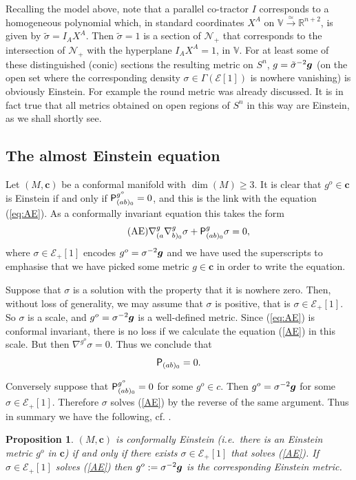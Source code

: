 \documentclass[a4paper,12pt]{amsart}
\def\Cal{\mathcal}
\newcommand{\V}{\mbox{\sf P}}
\newcommand{\cc}{\boldsymbol{c}}
\newcommand{\ce}{{\Cal E}}
\def\cN{\mathcal{N}}
\def\bg{\mbox{\boldmath $g$}}
\newcommand{\bV}{\mathbb{V}}
\newcommand{\lto}{\longrightarrow}
\newcommand{\si}{\sigma}
\newtheorem{proposition}[theorem]{Proposition}
\theoremstyle{remark}
\newcommand{\nn}[1]{(\ref{#1})}
\begin{document}
Recalling the model above, note that a parallel co-tractor $I$
corresponds to a homogeneous polynomial which, in standard coordinates
$X^A$ on $\mathbb{V}\stackrel{\simeq}{\lto}\mathbb{R}^{n+2}$, is given by
$\tilde{\si}=I_AX^A$. Then $\tilde{\si}=1$ is a section of $\cN_+$
that corresponds to the intersection of $\cN_+$ with the hyperplane
$I_AX^A=1$, in $\bV$. For at least some of these distinguished (conic)
sections the resulting metric on $S^n$, $g=\tilde{\si}^{-2}\bg$ (on
the open set where the corresponding density $\si\in \Gamma (\ce[1])$
is nowhere vanishing) is obviously Einstein. For example the round metric was already discussed. It is in fact true that all metrics obtained on open regions of $S^n$ in this way are Einstein, as we shall shortly see.

\subsection{The almost Einstein equation} \label{AEeq}


Let $(M,\cc)$ be a conformal manifold with $\dim (M)\geq  3$. It is clear that $g^o\in \cc$ is Einstein if and only if $\V^{g^o}_{(ab)_0}=0$, and this is the link with the equation \nn{eq:AE}.  As a conformally invariant
equation this takes the form
\begin{equation}\tag{AE}\label{AE}
\nabla^g_{(a}\nabla^g_{b)_0}\sigma+\V^g_{(ab)_0}\sigma=0,
\end{equation}
where $\si\in \ce_+[1]$ encodes $g^o=\si^{-2}\bg$ and we have used the superscripts to emphasise that
we have picked some metric $g\in \cc$ in order to write the equation.
 
Suppose that $\sigma$ is a solution with the property that it is
nowhere zero. Then, without loss of generality, we may assume that
$\si$ is positive, that is $\sigma\in \mathcal{E}_+[1]$. So $\si$ is
a scale, and $g^o=\sigma^{-2}\bg$ is a well-defined metric.  Since
\nn{eq:AE} is conformal invariant, there is no loss if we
calculate the equation \nn{AE} in this scale. But then
$\nabla^{g^o}\sigma=0$. Thus we conclude that
$$ \V_{(ab)_0}=0.$$

Conversely suppose that $\V^{g^o}_{(ab)_0}=0$ for some $g^o\in c$.
Then $g^o=\sigma^{-2}\bg$ for some $\sigma\in\mathcal{E}_+[1]$.
Therefore $\sigma$ solves \nn{AE} by the reverse of the same argument. 
Thus in summary we have the following, cf. \cite{LeBrunAmbi85}.
\begin{proposition}\label{Ecase}
$(M,\cc)$ is conformally Einstein (i.e.\ there is an Einstein metric $g^o$
in $\cc$) if and only if there exists $\sigma\in \mathcal{E}_+[1]$
that solves \nn{AE}. If $\sigma\in \mathcal{E}_+[1]$ solves
\nn{AE} then $g^o:=\si^{-2}\bg$ is the corresponding
Einstein metric.
\end{proposition}
\end{document}
